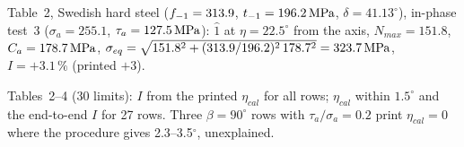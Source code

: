  Table~2, Swedish hard steel ($f_{-1}=313.9$, $t_{-1}=196.2\,\mathrm{MPa}$, $\delta=41.13^\circ$),
in-phase test~3 ($\sigma_a=255.1$, $\tau_a=127.5\,\mathrm{MPa}$): $\hat 1$ at $\eta=22.5^\circ$ from the axis,
$N_{max}=151.8$, $C_a=178.7\,\mathrm{MPa}$, $\sigma_{eq}=\sqrt{151.8^2+(313.9/196.2)^2\,178.7^2}=323.7\,\mathrm{MPa}$,
$I=+3.1\,\%$ (printed $+3$).

 Tables~2--4 (30 limits): $I$ from the printed $\eta_{cal}$ for all rows;
$\eta_{cal}$ within $1.5^\circ$ and the end-to-end $I$ for 27 rows. Three $\beta=90^\circ$ rows with
$\tau_a/\sigma_a=0.2$ print $\eta_{cal}=0$ where the procedure gives 2.3--3.5$^\circ$, unexplained.

